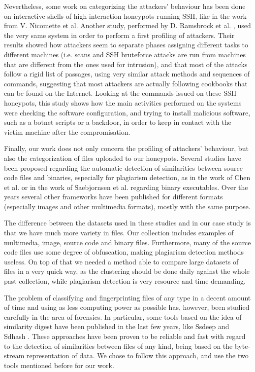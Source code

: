 Nevertheless, some work on categorizing the attackers' behaviour has been done on interactive shells of high-interaction honeypots running SSH, like in the work from V. Nicomette et al\cite{highhoney}. Another study, performed by D. Ramsbrock et al. \cite{sshprofiling}, used the very same system in order to perform a first profiling of attackers. Their results showed how attackers seem to separate phases assigning different tasks to different machines (i.e. scans and SSH bruteforce attacks are run from machines that are different from the ones used for intrusion), and that most of the attacks follow a rigid list of passages, using very similar attack methods and sequences of commands, suggesting that most attackers are actually following cookbooks that can be found on the Internet. Looking at the commands issued on these SSH honeypots, this study shows how the main activities performed on the systems were checking the software configuration, and trying to install malicious software, such as a botnet scripts or a backdoor, in order to keep in contact with the victim machine after the compromisation.

Finally, our work does not only concern the profiling of attackers' behaviour, but also the categorization of files uploaded to our honeypots. Several studies have been proposed regarding the automatic detection of similarities between source code files and binaries, especially for plagiarism detection, as in the work of Chen et al. \cite{plagdet1} or in the work of Saebjornsen et al. \cite{plagdet2} regarding binary executables. Over the years several other frameworks have been published for different formats (especially images and other multimedia formats), mostly with the same purpose.

The difference between the datasets used in these studies and in our case study is that we have much more variety in files. Our collection includes examples of multimedia, image, source code and binary files. Furthermore, many of the source code files use some degree of obfuscation, making plagiarism detection methods useless. On top of that we needed a method able to compare large datasets of files in a very quick way, as the clustering should be done daily against the whole past collection, while plagiarism detection is very resource and time demanding.

The problem of classifying and fingerprinting files of any type in a decent amount of time and using as less computing power as possible has, however, been studied carefully in the area of forensics. In particular, some tools based on the idea of similarity digest have been published in the last few years, like Ssdeep \cite{ssdeep} and Sdhash \cite{sdhash}. These approaches have been proven to be reliable and fast with regard to the detection of similarities between files of any kind, being based on the byte-stream representation of data. We chose to follow this approach, and use the two tools mentioned before for our work.

